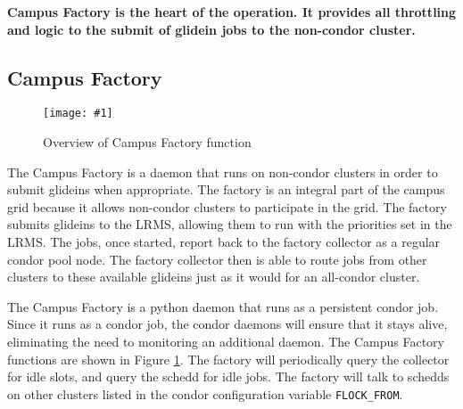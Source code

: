 \documentclass[11pt]{article}
\newlength{\imgwidth}
\newcommand\scalegraphics[1]{%
    \settowidth{\imgwidth}{\texttt{[image: \#1]}}%
    \setlength{\imgwidth}{\minof{\imgwidth}{\textwidth}}%
    \texttt{[image: \#1]}%
}
\begin{document}



\textbf{ Campus Factory is the heart of the operation.  It provides all throttling and logic to the submit of glidein jobs to the non-condor cluster.}

\subsection{Campus Factory}
\begin{figure}[ht]
\centering
\scalegraphics{images/FactoryOverview.pdf}
\caption{Overview of Campus Factory function}
\label{fig:campusfactoryoverview}
\end{figure}
The Campus Factory is a daemon that runs on non-condor clusters in order to submit glideins when appropriate.  The factory is an integral part of the campus grid because it allows non-condor clusters to participate in the grid.  The factory submits glideins to the LRMS, allowing them to run with the priorities set in the LRMS.  The jobs, once started, report back to the factory collector as a regular condor pool node.  The factory collector then is able to route jobs from other clusters to these available glideins just as it would for an all-condor cluster.

The Campus Factory is a python daemon that runs as a persistent condor job.  Since it runs as a condor job, the condor daemons will ensure that it stays alive, eliminating the need to monitoring an additional daemon.  The Campus Factory functions are shown in Figure \ref{fig:campusfactoryoverview}.  The factory will periodically query the collector for idle slots, and query the schedd for idle jobs.  The factory will talk to schedds on other clusters listed in the condor configuration variable \texttt{FLOCK\_FROM}.
\end{document}
